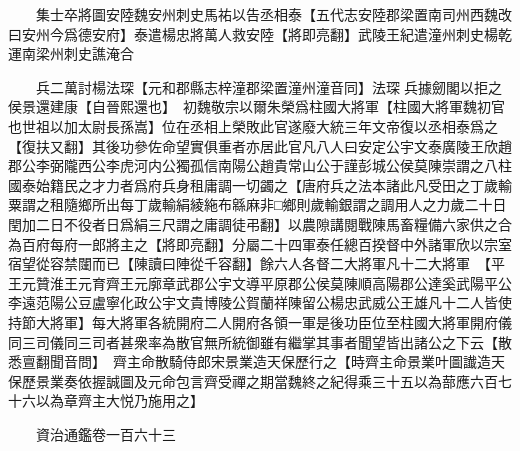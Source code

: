 　　集士卒將圖安陸魏安州刺史馬祐以告丞相泰【五代志安陸郡梁置南司州西魏改曰安州今爲德安府】泰遣楊忠將萬人救安陸【將即亮翻】武陵王紀遣潼州刺史楊乾運南梁州刺史譙淹合

　　兵二萬討楊法琛【元和郡縣志梓潼郡梁置潼州潼音同】法琛兵據劒閣以拒之　侯景還建康【自晉熙還也】　初魏敬宗以爾朱榮爲柱國大將軍【柱國大將軍魏初官也世祖以加太尉長孫嵩】位在丞相上榮敗此官遂廢大統三年文帝復以丞相泰爲之【復扶又翻】其後功參佐命望實俱重者亦居此官凡八人曰安定公宇文泰廣陵王欣趙郡公李弼隴西公李虎河内公獨孤信南陽公趙貴常山公于謹彭城公侯莫陳崇謂之八柱國泰始籍民之才力者爲府兵身租庸調一切蠲之【唐府兵之法本諸此凡受田之丁歲輸粟謂之租隨鄉所出每丁歲輸絹綾絁布緜麻非□鄉則歲輸銀謂之調用人之力歲二十日閏加二日不役者日爲絹三尺謂之庸調徒弔翻】以農隙講閱戰陳馬畜糧備六家供之合為百府每府一郎將主之【將即亮翻】分屬二十四軍泰任總百揆督中外諸軍欣以宗室宿望從容禁闥而已【陳讀曰陣從千容翻】餘六人各督二大將軍凡十二大將軍　【平王元贊淮王元育齊王元廓章武郡公宇文導平原郡公侯莫陳順高陽郡公達奚武陽平公李遠范陽公豆盧寧化政公宇文貴博陵公賀蘭祥陳留公楊忠武威公王雄凡十二人皆使持節大將軍】每大將軍各統開府二人開府各領一軍是後功臣位至柱國大將軍開府儀同三司儀同三司者甚衆率為散官無所統御雖有繼掌其事者聞望皆出諸公之下云【散悉亶翻聞音問】　齊主命散騎侍郎宋景業造天保歷行之【時齊主命景業叶圖䜟造天保歷景業奏依握誠圖及元命包言齊受禪之期當魏終之紀得乘三十五以為蔀應六百七十六以為章齊主大悦乃施用之】

　　資治通鑑卷一百六十三


    


 


 



 

 
  







 


　　
　　
　
　
　


　　

　















	
	









































